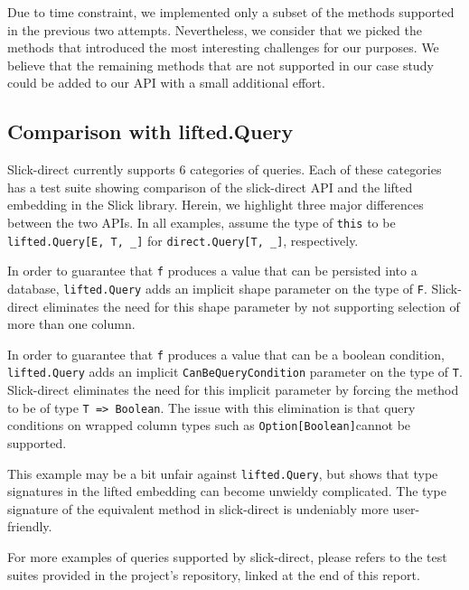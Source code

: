 Due to time constraint, we implemented only a subset of the methods supported in the previous two attempts.
Nevertheless, we consider that we picked the methods that introduced the most interesting challenges for our purposes.
We believe that the remaining methods that are not supported in our case study could be added to our API with a small additional effort.

\subsection{Comparison with lifted.Query} %
\label{sub:Comparisonwithlifted.Query}
Slick-direct currently supports 6 categories of queries.
Each of these categories has a test suite showing comparison of the slick-direct API and the lifted embedding in the Slick library.
Herein, we highlight three major differences between the two APIs.
In all examples, assume the type of \texttt{this} to be \texttt{lifted.Query[E, T, \_]} for \texttt{direct.Query[T, \_]}, respectively.

In order to guarantee that \texttt{f} produces a value that can be persisted into a database, \texttt{lifted.Query} adds an implicit shape parameter on the type of \texttt{F}.
Slick-direct eliminates the need for this shape parameter by not supporting selection of more than one column.


In order to guarantee that \texttt{f} produces a value that can be a boolean condition, \texttt{lifted.Query} adds an implicit \texttt{CanBeQueryCondition} parameter on the type of \texttt{T}.
Slick-direct eliminates the need for this implicit parameter by forcing the method to be of type \texttt{T => Boolean}.
The issue with this elimination is that query conditions on wrapped column types such as \texttt{Option[Boolean]}cannot be supported.


This example may be a bit unfair against \texttt{lifted.Query}, but shows that type signatures in the lifted embedding can become unwieldy complicated.
The type signature of the equivalent method in slick-direct is undeniably more user-friendly.

For more examples of queries supported by slick-direct, please refers to the test suites provided in the project's repository, linked at the end of this report.



